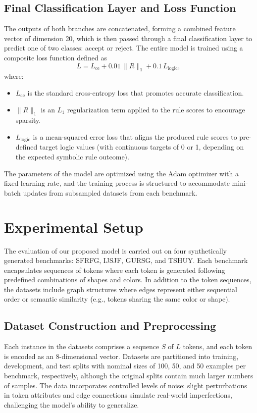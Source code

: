 \documentclass[11pt]{article}
\begin{document}
\subsection{Final Classification Layer and Loss Function}
The outputs of both branches are concatenated, forming a combined feature vector of dimension 20, which is then passed through a final classification layer to predict one of two classes: accept or reject. The entire model is trained using a composite loss function defined as
\[
L = L_{\mathrm{ce}} + 0.01\,\|R\|_1 + 0.1\,L_{\mathrm{logic}},
\]
where:
\begin{itemize}
    \item \( L_{\mathrm{ce}} \) is the standard cross-entropy loss that promotes accurate classification.
    \item \( \|R\|_1 \) is an \(L_1\) regularization term applied to the rule scores to encourage sparsity.
    \item \( L_{\mathrm{logic}} \) is a mean-squared error loss that aligns the produced rule scores to pre-defined target logic values (with continuous targets of 0 or 1, depending on the expected symbolic rule outcome).
\end{itemize}
The parameters of the model are optimized using the Adam optimizer with a fixed learning rate, and the training process is structured to accommodate mini-batch updates from subsampled datasets from each benchmark.

\section{Experimental Setup}
The evaluation of our proposed model is carried out on four synthetically generated benchmarks: SFRFG, IJSJF, GURSG, and TSHUY. Each benchmark encapsulates sequences of tokens where each token is generated following predefined combinations of shapes and colors. In addition to the token sequences, the datasets include graph structures where edges represent either sequential order or semantic similarity (e.g., tokens sharing the same color or shape). 

\subsection{Dataset Construction and Preprocessing}
Each instance in the datasets comprises a sequence \(S\) of \(L\) tokens, and each token is encoded as an 8-dimensional vector. Datasets are partitioned into training, development, and test splits with nominal sizes of 100, 50, and 50 examples per benchmark, respectively, although the original splits contain much larger numbers of samples. The data incorporates controlled levels of noise: slight perturbations in token attributes and edge connections simulate real-world imperfections, challenging the model’s ability to generalize.
\end{document}

